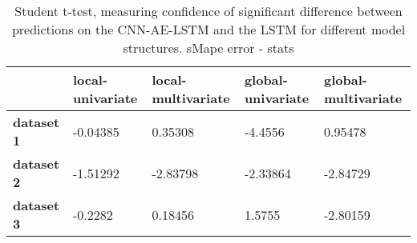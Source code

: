 \begin{table}[h]
\centering
\caption{Student t-test, measuring confidence of significant difference between predictions on the CNN-AE-LSTM and the LSTM for different model structures. sMape error - stats}
\label{table:ttest-stats-main-experiments-sMAPE}
\begin{tabular}{lllll}
\toprule
{} & local-univariate & local-multivariate & global-univariate & global-multivariate \\
\midrule
\textbf{dataset 1} &         -0.04385 &            0.35308 &           -4.4556 &             0.95478 \\
\textbf{dataset 2} &         -1.51292 &           -2.83798 &          -2.33864 &            -2.84729 \\
\textbf{dataset 3} &          -0.2282 &            0.18456 &            1.5755 &            -2.80159 \\
\bottomrule
\end{tabular}
\end{table}
